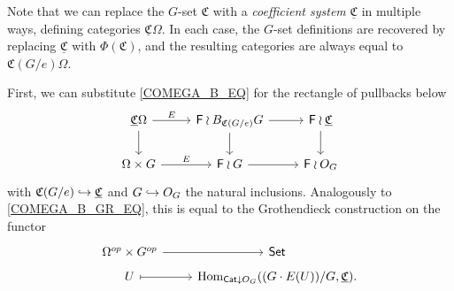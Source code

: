 \documentclass[a4paper,10pt
]{article}%
\newcommand{\UC}{\underline{\mathfrak C}}
\renewcommand{\1}{\ensuremath{\mathbb{id}}}
\begin{document}
\begin{remark}
      Note that we can replace the $G$-set $\mathfrak C$ with a
      \textit{coefficient system} $\underline{\mathfrak C}$ in multiple ways,
      defining categories $\UC\Omega$.
      In each case, the $G$-set definitions are recovered by replacing $\UC$ with $\Phi(\mathfrak C)$,
      and the resulting categories are always equal to $\mathfrak C(G/e)\Omega$.

      
      First, we can substitute \eqref{COMEGA_B_EQ} for the rectangle of pullbacks below
      \begin{equation}
            \label{COMEGA_OG_EQ}
            \begin{tikzcd}
                  \underline{\mathfrak C}\Omega \arrow[d] \arrow[r, "E"]
                  &
                  \mathsf F \wr B_{\mathfrak C(G/e)}G \arrow[r] \arrow[d]
                  &
                  \mathsf F \wr \underline{\mathfrak C} \arrow[d]
                  \\
                  \Omega \times G \arrow[r, "E"]
                  &
                  \mathsf F \wr G \arrow[r]
                  &
                  \mathsf F \wr O_G
            \end{tikzcd}
      \end{equation}
      with $\mathfrak C(G/e) \hookrightarrow \underline{\mathfrak C}$ and $G \hookrightarrow O_G$ the natural inclusions.
      Analogously to \eqref{COMEGA_B_GR_EQ}, this is equal to the Grothendieck construction on the functor
      \begin{equation}
            \label{COMEGA_OG_GR_EQ}
            \begin{tikzcd}[row sep = tiny]
                  \Omega^{op} \times G^{op} \arrow[r]
                  &
                  \mathsf{Set}
                  \\
                  U \arrow[r, mapsto]
                  &
                  \Hom_{\mathsf{Cat} \downarrow O_G}((G \cdot E(U))/G, \UC).
            \end{tikzcd}
      \end{equation}



\end{remark}
\end{document}
